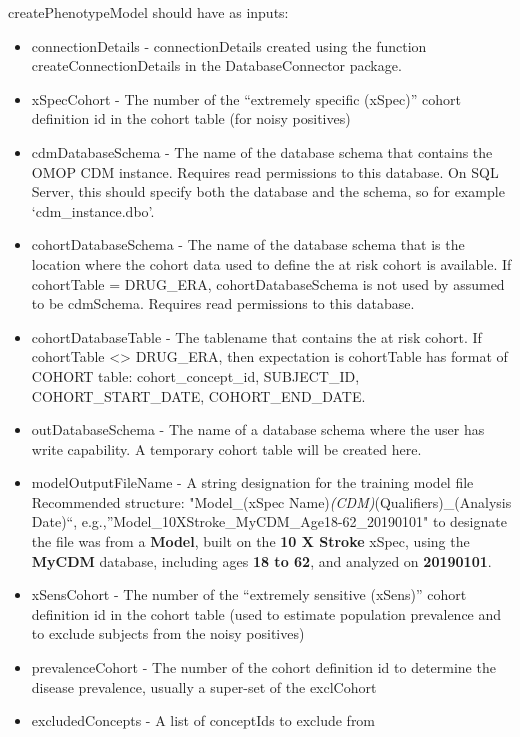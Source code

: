 \documentclass[
]{article}
\providecommand{\tightlist}{%
  \setlength{\itemsep}{0pt}\setlength{\parskip}{0pt}}
\begin{document}
createPhenotypeModel should have as inputs:

\begin{itemize}
\tightlist
\item
  connectionDetails - connectionDetails created using the function
  createConnectionDetails in the DatabaseConnector package.
\item
  xSpecCohort - The number of the ``extremely specific (xSpec)'' cohort
  definition id in the cohort table (for noisy positives)
\item
  cdmDatabaseSchema - The name of the database schema that contains the
  OMOP CDM instance. Requires read permissions to this database. On SQL
  Server, this should specify both the database and the schema, so for
  example `cdm\_instance.dbo'.
\item
  cohortDatabaseSchema - The name of the database schema that is the
  location where the cohort data used to define the at risk cohort is
  available. If cohortTable = DRUG\_ERA, cohortDatabaseSchema is not
  used by assumed to be cdmSchema. Requires read permissions to this
  database.
\item
  cohortDatabaseTable - The tablename that contains the at risk cohort.
  If cohortTable \textless{}\textgreater{} DRUG\_ERA, then expectation
  is cohortTable has format of COHORT table: cohort\_concept\_id,
  SUBJECT\_ID, COHORT\_START\_DATE, COHORT\_END\_DATE.
\item
  outDatabaseSchema - The name of a database schema where the user has
  write capability. A temporary cohort table will be created here.
\item
  modelOutputFileName - A string designation for the training model file
  Recommended structure: "Model\_(xSpec
  Name)\emph{(CDM)}(Qualifiers)\_(Analysis Date)``,
  e.g.,''Model\_10XStroke\_MyCDM\_Age18-62\_20190101" to designate the
  file was from a \textbf{Model}, built on the \textbf{10 X Stroke}
  xSpec, using the \textbf{MyCDM} database, including ages \textbf{18 to
  62}, and analyzed on \textbf{20190101}.
\item
  xSensCohort - The number of the ``extremely sensitive (xSens)'' cohort
  definition id in the cohort table (used to estimate population
  prevalence and to exclude subjects from the noisy positives)
\item
  prevalenceCohort - The number of the cohort definition id to determine
  the disease prevalence, usually a super-set of the exclCohort
\item
  excludedConcepts - A list of conceptIds to exclude from

\end{itemize}
\end{document}
